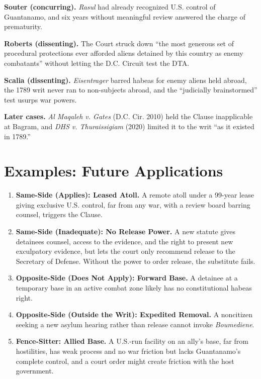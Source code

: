 \documentclass[12pt]{article}
\begin{document}
\textbf{Souter (concurring).} \textit{Rasul} had already recognized U.S. control of Guantanamo, and six years without meaningful review answered the charge of prematurity.

\textbf{Roberts (dissenting).} The Court struck down ``the most generous set of procedural protections ever afforded aliens detained by this country as enemy combatants'' without letting the D.C. Circuit test the DTA.

\textbf{Scalia (dissenting).} \textit{Eisentrager} barred habeas for enemy aliens held abroad, the 1789 writ never ran to non-subjects abroad, and the ``judicially brainstormed'' test usurps war powers.

\textbf{Later cases.} \textit{Al Maqaleh v. Gates} (D.C. Cir. 2010) held the Clause inapplicable at Bagram, and \textit{DHS v. Thuraissigiam} (2020) limited it to the writ ``as it existed in 1789.''

\section{Examples: Future Applications}

\begin{enumerate}
\item \textbf{Same-Side (Applies): Leased Atoll.} A remote atoll under a 99-year lease giving exclusive U.S. control, far from any war, with a review board barring counsel, triggers the Clause.
\item \textbf{Same-Side (Inadequate): No Release Power.} A new statute gives detainees counsel, access to the evidence, and the right to present new exculpatory evidence, but lets the court only recommend release to the Secretary of Defense. Without the power to order release, the substitute fails.
\item \textbf{Opposite-Side (Does Not Apply): Forward Base.} A detainee at a temporary base in an active combat zone likely has no constitutional habeas right.
\item \textbf{Opposite-Side (Outside the Writ): Expedited Removal.} A noncitizen seeking a new asylum hearing rather than release cannot invoke \textit{Boumediene}.
\item \textbf{Fence-Sitter: Allied Base.} A U.S.-run facility on an ally's base, far from hostilities, has weak process and no war friction but lacks Guantanamo's complete control, and a court order might create friction with the host government.
\end{enumerate}
\end{document}
